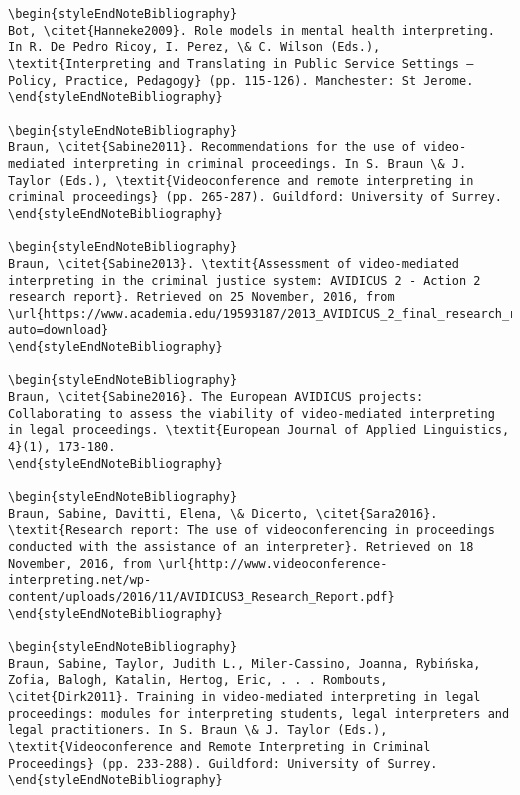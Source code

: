 \documentclass[output=paper]{langsci/langscibook}
\begin{document}
\begin{verbatim}
\begin{styleEndNoteBibliography}
Bot, \citet{Hanneke2009}. Role models in mental health interpreting. In R. De Pedro Ricoy, I. Perez, \& C. Wilson (Eds.), \textit{Interpreting and Translating in Public Service Settings – Policy, Practice, Pedagogy} (pp. 115-126). Manchester: St Jerome.
\end{styleEndNoteBibliography}

\begin{styleEndNoteBibliography}
Braun, \citet{Sabine2011}. Recommendations for the use of video-mediated interpreting in criminal proceedings. In S. Braun \& J. Taylor (Eds.), \textit{Videoconference and remote interpreting in criminal proceedings} (pp. 265-287). Guildford: University of Surrey.
\end{styleEndNoteBibliography}

\begin{styleEndNoteBibliography}
Braun, \citet{Sabine2013}. \textit{Assessment of video-mediated interpreting in the criminal justice system: AVIDICUS 2 - Action 2 research report}. Retrieved on 25 November, 2016, from \url{https://www.academia.edu/19593187/2013_AVIDICUS_2_final_research_report?auto=download}
\end{styleEndNoteBibliography}

\begin{styleEndNoteBibliography}
Braun, \citet{Sabine2016}. The European AVIDICUS projects: Collaborating to assess the viability of video-mediated interpreting in legal proceedings. \textit{European Journal of Applied Linguistics, 4}(1), 173-180. 
\end{styleEndNoteBibliography}

\begin{styleEndNoteBibliography}
Braun, Sabine, Davitti, Elena, \& Dicerto, \citet{Sara2016}. \textit{Research report: The use of videoconferencing in proceedings conducted with the assistance of an interpreter}. Retrieved on 18 November, 2016, from \url{http://www.videoconference-interpreting.net/wp-content/uploads/2016/11/AVIDICUS3_Research_Report.pdf}
\end{styleEndNoteBibliography}

\begin{styleEndNoteBibliography}
Braun, Sabine, Taylor, Judith L., Miler-Cassino, Joanna, Rybińska, Zofia, Balogh, Katalin, Hertog, Eric, . . . Rombouts, \citet{Dirk2011}. Training in video-mediated interpreting in legal proceedings: modules for interpreting students, legal interpreters and legal practitioners. In S. Braun \& J. Taylor (Eds.), \textit{Videoconference and Remote Interpreting in Criminal Proceedings} (pp. 233-288). Guildford: University of Surrey.
\end{styleEndNoteBibliography}


\end{verbatim}
\end{document}
